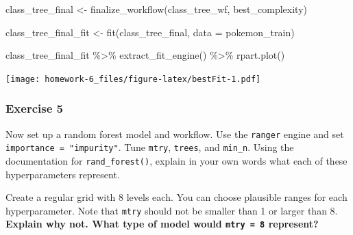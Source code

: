 \documentclass[
]{article}
\newenvironment{Shaded}{\begin{snugshade}}{\end{snugshade}}
\newcommand{\AttributeTok}[1]{\textcolor[rgb]{0.77,0.63,0.00}{#1}}
\newcommand{\FunctionTok}[1]{\textcolor[rgb]{0.00,0.00,0.00}{#1}}
\newcommand{\NormalTok}[1]{#1}
\newcommand{\OtherTok}[1]{\textcolor[rgb]{0.56,0.35,0.01}{#1}}
\newcommand{\SpecialCharTok}[1]{\textcolor[rgb]{0.00,0.00,0.00}{#1}}
\begin{document}
\begin{Shaded}
\begin{Highlighting}[]
\NormalTok{class\_tree\_final }\OtherTok{\textless{}{-}} \FunctionTok{finalize\_workflow}\NormalTok{(class\_tree\_wf, best\_complexity)}

\NormalTok{class\_tree\_final\_fit }\OtherTok{\textless{}{-}} \FunctionTok{fit}\NormalTok{(class\_tree\_final, }\AttributeTok{data =}\NormalTok{ pokemon\_train)}

\NormalTok{class\_tree\_final\_fit }\SpecialCharTok{\%\textgreater{}\%}
  \FunctionTok{extract\_fit\_engine}\NormalTok{() }\SpecialCharTok{\%\textgreater{}\%}
  \FunctionTok{rpart.plot}\NormalTok{()}
\end{Highlighting}
\end{Shaded}

\texttt{[image: homework-6\_files/figure-latex/bestFit-1.pdf]}

\hypertarget{exercise-5-1}{%
\subsubsection{Exercise 5}\label{exercise-5-1}}

Now set up a random forest model and workflow. Use the \texttt{ranger}
engine and set \texttt{importance\ =\ "impurity"}. Tune \texttt{mtry},
\texttt{trees}, and \texttt{min\_n}. Using the documentation for
\texttt{rand\_forest()}, explain in your own words what each of these
hyperparameters represent.

Create a regular grid with 8 levels each. You can choose plausible
ranges for each hyperparameter. Note that \texttt{mtry} should not be
smaller than 1 or larger than 8. \textbf{Explain why not. What type of
model would \texttt{mtry\ =\ 8} represent?}
\end{document}
